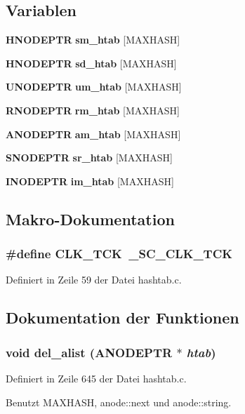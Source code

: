 \subsection*{Variablen}
\begin{CompactItemize}
\item 
{\bf HNODEPTR} {\bf sm\_\-htab} [MAXHASH]
\item 
{\bf HNODEPTR} {\bf sd\_\-htab} [MAXHASH]
\item 
{\bf UNODEPTR} {\bf um\_\-htab} [MAXHASH]
\item 
{\bf RNODEPTR} {\bf rm\_\-htab} [MAXHASH]
\item 
{\bf ANODEPTR} {\bf am\_\-htab} [MAXHASH]
\item 
{\bf SNODEPTR} {\bf sr\_\-htab} [MAXHASH]
\item 
{\bf INODEPTR} {\bf im\_\-htab} [MAXHASH]
\end{CompactItemize}


\subsection{Makro-Dokumentation}
\subsubsection{\setlength{\rightskip}{0pt plus 5cm}\#define CLK\_\-TCK~\_\-SC\_\-CLK\_\-TCK}\label{hashtab_8c_03df76d1f70664d745ca8de2864e39b3}




Definiert in Zeile 59 der Datei hashtab.c.

\subsection{Dokumentation der Funktionen}
\subsubsection{\setlength{\rightskip}{0pt plus 5cm}void del\_\-alist ({\bf ANODEPTR} $\ast$ {\em htab})}\label{hashtab_8c_ebb84eee637f50db17ab93d1050e8bd1}




Definiert in Zeile 645 der Datei hashtab.c.

Benutzt MAXHASH, anode::next und anode::string.

